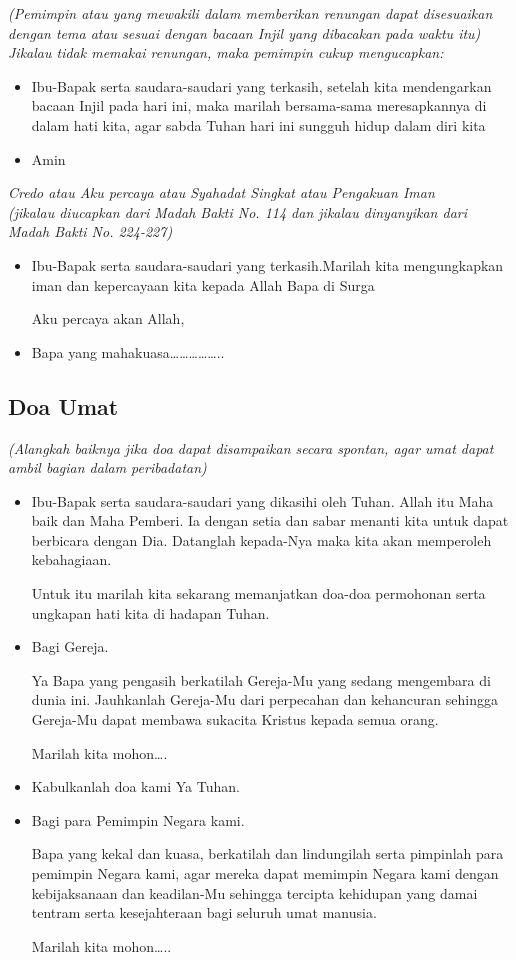 \documentclass[a4paper,12pt]{article}
\newcommand{\BU}[1]{\begin{itemize} \item[U:] #1 \end{itemize}}
\newcommand{\BP}[1]{\begin{itemize} \item[P:] #1 \end{itemize}}
\begin{document}
\textit{(Pemimpin atau yang mewakili dalam memberikan renungan dapat disesuaikan dengan tema atau sesuai dengan bacaan Injil
yang dibacakan pada waktu itu)
\\
Jikalau tidak memakai renungan, maka pemimpin cukup mengucapkan:}

\BP{Ibu-Bapak serta saudara-saudari yang terkasih, setelah kita mendengarkan bacaan Injil pada hari ini, maka
marilah bersama-sama meresapkannya di dalam hati kita, agar sabda Tuhan hari ini sungguh hidup dalam diri kita}

\BU{Amin}

\emph{\emph{Credo} atau Aku percaya atau Syahadat Singkat atau Pengakuan Iman
\\
(jikalau diucapkan dari Madah Bakti No. 114 dan jikalau dinyanyikan dari Madah Bakti No. 224-227)}

\BP{Ibu-Bapak serta saudara-saudari yang terkasih.Marilah kita mengungkapkan iman dan kepercayaan
kita kepada Allah Bapa di Surga

Aku percaya akan Allah,}

\BU{Bapa yang mahakuasa{\dots}{\dots}{\dots}{\dots}{\dots}..}

\subsection*{Doa Umat}

\textit{(Alangkah baiknya jika doa dapat disampaikan secara spontan, agar umat dapat ambil bagian dalam peribadatan)}

\BP{Ibu-Bapak serta saudara-saudari yang dikasihi oleh Tuhan. Allah itu Maha baik dan Maha Pemberi. Ia dengan setia dan
sabar menanti kita untuk dapat berbicara dengan Dia. Datanglah kepada-Nya maka kita akan memperoleh kebahagiaan.

Untuk itu marilah kita sekarang memanjatkan doa-doa permohonan serta ungkapan hati kita di hadapan Tuhan.}

\BP{Bagi Gereja.

Ya Bapa yang pengasih berkatilah Gereja-Mu yang sedang mengembara di dunia ini. Jauhkanlah Gereja-Mu dari perpecahan dan
kehancuran sehingga Gereja-Mu dapat membawa sukacita Kristus kepada semua orang.

Marilah kita mohon{\dots}.}

\BU{Kabulkanlah doa kami Ya Tuhan.}

\BP{Bagi para Pemimpin Negara kami.

Bapa yang kekal dan kuasa, berkatilah dan lindungilah serta pimpinlah para pemimpin Negara kami, agar mereka dapat
memimpin Negara kami dengan kebijaksanaan dan keadilan-Mu sehingga tercipta kehidupan yang damai tentram serta
kesejahteraan bagi seluruh umat manusia.

Marilah kita mohon{\dots}..}
\end{document}

